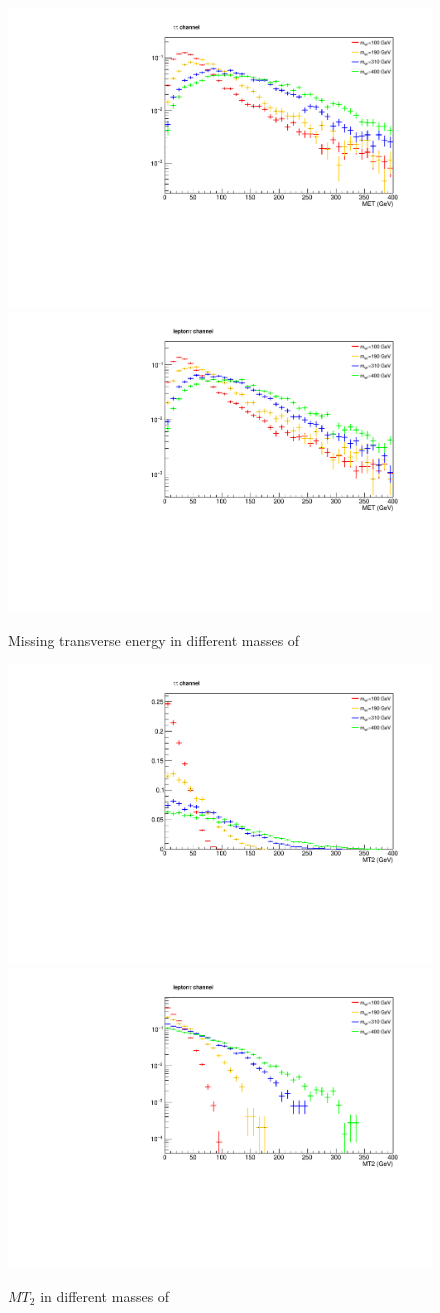 \begin{figure}[!ht]
\centering
\includegraphics*[width=.45\textwidth]{figs/MET-hh.pdf}
\hspace{3mm}
\includegraphics*[width=.45\textwidth]{figs/MET-lh.pdf}
\caption{Missing transverse energy in different masses of \wprime }
\label{met}
\end{figure}


\begin{figure}[!ht]
\centering
\includegraphics*[width=.45\textwidth]{figs/MT2-hh.pdf}
\hspace{3mm}
\includegraphics*[width=.45\textwidth]{figs/MT2-lh.pdf}
\caption{$MT_2$ in different masses of \wprime }
\label{mt2}
\end{figure}

